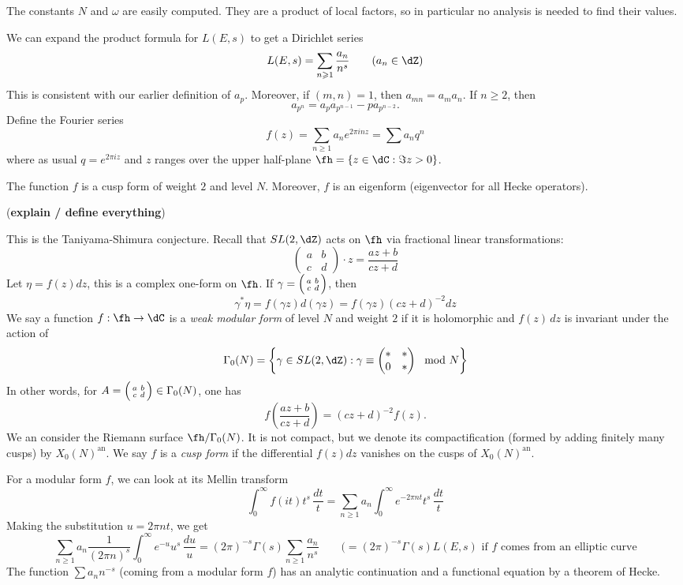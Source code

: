 \documentclass{article}
\begin{document}
The constants $N$ and $\omega$ are easily computed. They are a product of local 
factors, so in particular no analysis is needed to find their values. 

We can expand the product formula for $L(E,s)$ to get a Dirichlet series 
\[
  L(E,s) = \sum_{n\geqslant 1} \frac{a_n}{n^s} \qquad (a_n\in \dZ)
\]
This is consistent with our earlier definition of $a_p$. Moreover, if 
$(m,n)=1$, then $a_{mn}=a_m a_n$. If $n\geqslant 2$, then 
\[
  a_{p^n} = a_p a_{p^{n-1}} - p a_{p^{n-2}} \text{.}
\]
Define the Fourier series 
\[
  f(z) = \sum_{n\geqslant 1} a_n e^{2\pi i n z} = \sum a_n q^n
\]
where as usual $q=e^{2\pi i z}$ and $z$ ranges over the upper half-plane 
$\fh=\{z\in \dC:\Im z>0\}$. 

\begin{theorem}
The function $f$ is a cusp form of weight $2$ and level $N$. Moreover, $f$ is 
an eigenform (eigenvector for all Hecke operators). 
\end{theorem}

(\textbf{explain / define everything})

This is the Taniyama-Shimura conjecture. Recall that $SL(2,\dZ)$ acts on $\fh$ 
via fractional linear transformations:
\[
  \begin{pmatrix} a & b \\ c & d\end{pmatrix}\cdot z = \frac{a z+b}{c z+d}
\]
Let $\eta=f(z)dz$, this is a complex one-form on $\fh$. If 
$\gamma=\Big(\begin{smallmatrix} a & b \\ c & d \end{smallmatrix} \Big)$, then 
\[
  \gamma^\ast \eta = f(\gamma z)d(\gamma z) = f(\gamma z)(c z+d)^{-2} dz 
\]
We say a function $f:\fh\to \dC$ is a \emph{weak modular form} of level $N$ and 
weight $2$ if it is holomorphic and $f(z)\, dz$ is invariant under the action of 
\[
  \Gamma_0(N) = \left\{\gamma \in SL(2,\dZ) : \gamma \equiv \begin{pmatrix} \ast & \ast \\ 0 & \ast \end{pmatrix} \mod N\right\}
\]
In other words, for $A=\Big(\begin{smallmatrix} a & b \\ c & d \end{smallmatrix} \Big)\in\Gamma_0(N)$, one has 
\[
  f\left(\frac{a z+b}{c z+d}\right) = (c z+d)^{-2} f(z) \text{.}
\]
We an consider the Riemann surface $\fh/\Gamma_0(N)$. It is not compact, but we 
denote its compactification (formed by adding finitely many cusps) by 
$X_0(N)^\text{an}$. We say $f$ is a \emph{cusp form} if the differential 
$f(z) dz$ vanishes on the cusps of $X_0(N)^\text{an}$. 

For a modular form $f$, we can look at its Mellin transform 
\[
  \int_0^\infty f(i t) t^s\, \frac{dt}{t}  = \sum_{n\geqslant 1} a_n \int_0^\infty e^{-2\pi n t} t^s\, \frac{dt}{t}
\]
Making the substitution $u=2\pi n t$, we get 
\[
  \sum_{n\geqslant 1} a_n \frac{1}{(2\pi n)^s} \int_0^\infty e^{-u} u^s\, \frac{du}{u}
    = (2\pi)^{-s} \Gamma(s) \sum_{n\geqslant 1} \frac{a_n}{n^s} \qquad (= (2\pi)^{-s} \Gamma(s) L(E,s) \text{ if $f$ comes from an elliptic curve}
\]
The function $\sum a_n n^{-s}$ (coming from a modular form $f$) has an analytic 
continuation and a functional equation by a theorem of Hecke. 
\end{document}
